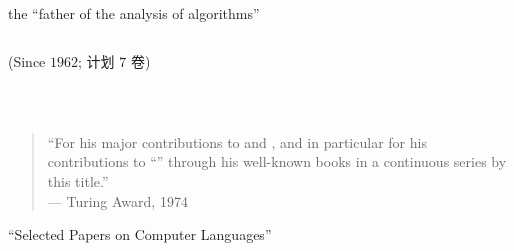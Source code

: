 
\begin{frame}{}
\end{frame}

\begin{frame}{}
  \begin{center}
    {\large the ``father of the analysis of algorithms''}
  \end{center}

  \begin{columns}
      \begin{center}
        (Since $1962$; 计划 $7$ 卷)
      \end{center}
  \end{columns}

  \vspace{0.30cm}
  \begin{center}
     \\[6pt]
  \end{center}
\end{frame}

\begin{frame}{}

  \vspace{0.30cm}
  \begin{quote}
    ``For his major contributions to 
      and ,
      and in particular for his contributions to ``''
      through his well-known books in a continuous series by this title.'' \\[5pt]

    \hfill --- Turing Award, 1974
  \end{quote}
\end{frame}

\begin{frame}{}
  \begin{center}
    ``Selected Papers on Computer Languages''



    \pause
    \vspace{0.20cm}
  \end{center}
\end{frame}

